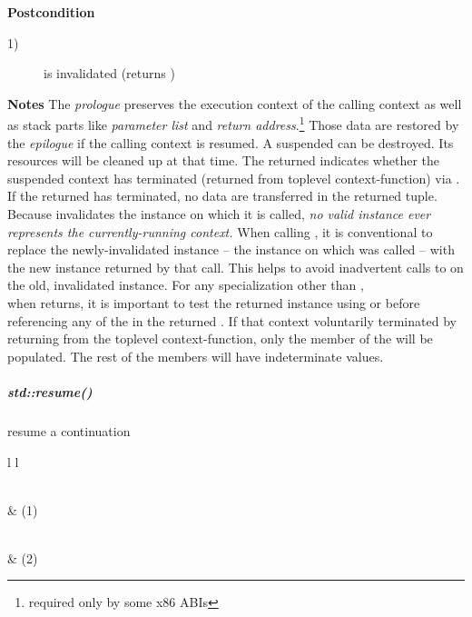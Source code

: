 {\bfseries Postcondition}
\begin{description}
    \item[1)]  is invalidated (\opbool returns )
\end{description}

{\bfseries Notes}
\newline
The \emph{prologue} preserves the execution context of the calling context as
well as stack parts like \emph{parameter list} and \emph{return
address}.\footnote{required only by some x86 ABIs}
Those data are restored by the \emph{epilogue} if the calling context is
resumed.
\newline
A suspended  can be destroyed. Its resources will be
cleaned up at that time.
\newline
The returned  indicates whether the suspended context
has terminated (returned from toplevel context-function) via \opbool. If the
returned  has terminated, no data are transferred in
the returned tuple.
\newline
Because \op invalidates the instance on which it is called, \emph{no
valid \cont instance ever represents the currently-running context.}
\newline
When calling \op, it is conventional to replace the newly-invalidated 
instance -- the instance on which \op was called -- with the new instance
returned by that \op call. This helps to avoid inadvertent calls to \op on the
old, invalidated instance.
\newline
For any \cont specialization other than \contvoid,\\
when \op returns, it is important to test the returned \contargs instance using
\opbool or  before referencing any of the  in the
returned \contargstup. If that context voluntarily terminated by returning
from the toplevel context-function, only the \contargs member of
the  will be populated. The rest of the members will have
indeterminate values.


\subparagraph*{std::resume()}
resume a continuation\\

\begin{tabular}{ l l }
    \midrule

    \\
     & (1)\\

    \midrule

    \\
     & (2)\\

    \midrule
\end{tabular}

